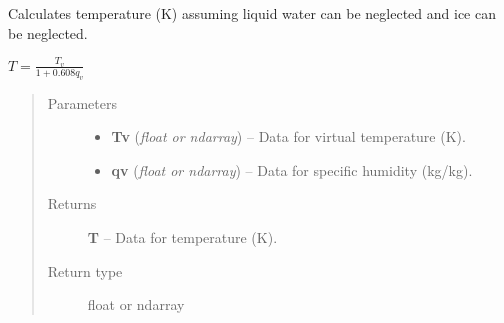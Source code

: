 \documentclass[letterpaper,10pt,english]{sphinxmanual}
\begin{document}

\begin{fulllineitems}
\label{atmos:atmos.equations.T_from_Tv_qv}
Calculates temperature (K) assuming liquid water can be neglected and ice can be
neglected.

\(T = \frac{T_v}{1 + 0.608 q_v}\)
\begin{quote}\begin{description}
\item[{Parameters}] \leavevmode\begin{itemize}
\item {} 
\textbf{Tv} (\emph{float or ndarray}) -- Data for virtual temperature (K).

\item {} 
\textbf{qv} (\emph{float or ndarray}) -- Data for specific humidity (kg/kg).

\end{itemize}

\item[{Returns}] \leavevmode
\textbf{T} --
Data for temperature (K).

\item[{Return type}] \leavevmode
float or ndarray

\end{description}\end{quote}

\end{fulllineitems}

\end{document}
